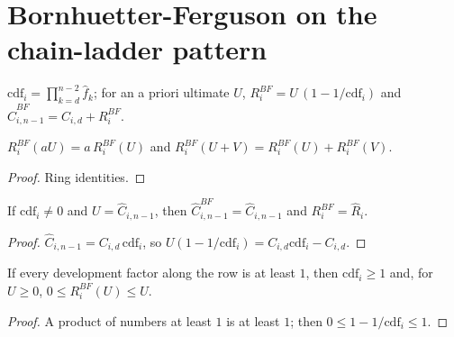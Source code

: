 \chapter{Bornhuetter-Ferguson on the chain-ladder pattern}

\begin{definition}\label{def:bf}\leanok
{}
$\mathrm{cdf}_i = \prod_{k=d}^{n-2}\hat f_k$; for an a priori ultimate $U$,
$R^{BF}_i = U\,(1 - 1/\mathrm{cdf}_i)$ and $\hat C^{BF}_{i,n-1} = C_{i,d} + R^{BF}_i$.
\end{definition}

\begin{lemma}[Linearity]\label{lem:bf_linear}\leanok
{}
$R^{BF}_i(aU) = a\,R^{BF}_i(U)$ and $R^{BF}_i(U+V) = R^{BF}_i(U) + R^{BF}_i(V)$.
\end{lemma}
\begin{proof}\leanok Ring identities. \end{proof}

\begin{theorem}\label{thm:bf_cl}\leanok
{}
If $\mathrm{cdf}_i \neq 0$ and $U = \hat C_{i,n-1}$, then $\hat C^{BF}_{i,n-1} = \hat C_{i,n-1}$ and
$R^{BF}_i = \hat R_i$.
\end{theorem}
\begin{proof}\leanok $\hat C_{i,n-1} = C_{i,d}\,\mathrm{cdf}_i$, so $U(1 - 1/\mathrm{cdf}_i) = C_{i,d}\mathrm{cdf}_i - C_{i,d}$. \end{proof}

\begin{lemma}\label{lem:bf_frac}\leanok
{}
If every development factor along the row is at least $1$, then $\mathrm{cdf}_i \ge 1$ and, for
$U \ge 0$, $0 \le R^{BF}_i(U) \le U$.
\end{lemma}
\begin{proof}\leanok A product of numbers at least $1$ is at least $1$; then $0 \le 1 - 1/\mathrm{cdf}_i \le 1$. \end{proof}

